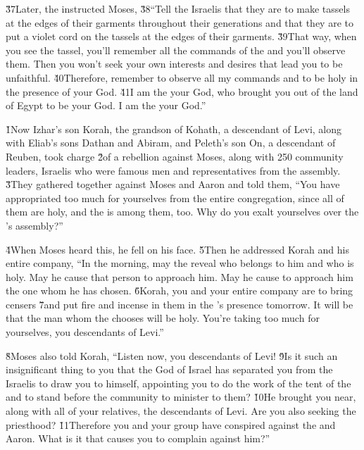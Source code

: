 \v{37}Later, the  instructed Moses, \v{38}``Tell the Israelis that they are to make tassels at the edges of their garments throughout their generations and that they are to put a violet cord on the tassels at the edges of their garments. \v{39}That way, when you see the tassel, you'll remember all the commands of the  and you'll observe them. Then you won't seek your own interests and desires that lead you to be unfaithful. \v{40}Therefore, remember to observe all my commands and to be holy in the presence of your God. \v{41}I am the  your God, who brought you out of the land of Egypt to be your God. I am the  your God.''

\v{1}Now Izhar's son Korah, the grandson of Kohath, a descendant of Levi, along with Eliab's sons Dathan and Abiram, and Peleth's son On, a descendant of Reuben, took charge \v{2}of a rebellion against Moses, along with 250 community leaders, Israelis who were famous men and representatives from the assembly. \v{3}They gathered together against Moses and Aaron and told them, ``You have appropriated too much for yourselves from the entire congregation, since all of them are holy, and the  is among them, too. Why do you exalt yourselves over the 's assembly?''

\v{4}When Moses heard this, he fell on his face. \v{5}Then he addressed Korah and his entire company, ``In the morning, may the  reveal who belongs to him and who is holy. May he cause that person to approach him. May he cause to approach him the one whom he has chosen. \v{6}Korah, you and your entire company are to bring censers \v{7}and put fire and incense in them in the 's presence tomorrow. It will be that the man whom the  chooses will be holy. You're taking too much for yourselves, you descendants of Levi.''

\v{8}Moses also told Korah, ``Listen now, you descendants of Levi! \v{9}Is it such an insignificant thing to you that the God of Israel has separated you from the Israelis to draw you to himself, appointing you to do the work of the tent of the  and to stand before the community to minister to them? \v{10}He brought you near, along with all of your relatives, the descendants of Levi. Are you also seeking the priesthood? \v{11}Therefore you and your group have conspired against the  and Aaron. What is it that causes you to complain against him?''

